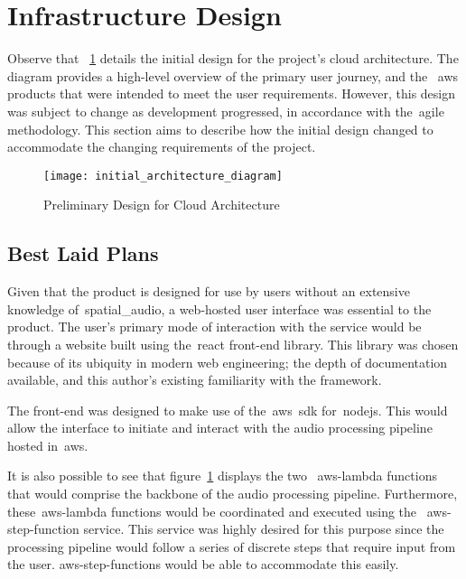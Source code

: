 \thispagestyle{plain}
\newpage
\section{Infrastructure Design}\label{sec:infrastructure-design}

\normalsize

Observe that ~\ref{fig:preliminary-design} details the initial design for the project's cloud architecture.
The diagram provides a high-level overview of the primary user journey,
and the ~\gls{aws} products that were intended to meet the user requirements.
However, this design was subject to change as development progressed, in accordance with the~\gls{agile} methodology.
This section aims to describe how the initial design changed to accommodate the changing requirements of the project.

\begin{figure}[!htb]
    \minipage{\textwidth}
    \texttt{[image: initial\_architecture\_diagram]}
    \caption{Preliminary Design for Cloud Architecture}\label{fig:preliminary-design}
    \endminipage\hfill
\end{figure}

\subsection{Best Laid Plans}\label{subsec:best-laid-plans}

Given that the product is designed for use by users without an extensive knowledge of~\gls{spatial_audio},
a web-hosted user interface was essential to the product.
The user’s primary mode of interaction with the service would be through a website
built using the~\gls{react} front-end library.
This library was chosen because of its ubiquity in modern web engineering; the depth of documentation available,
and this author’s existing familiarity with the framework.

The front-end was designed to make use of the~\gls{aws}~\gls{sdk} for~\gls{nodejs}.
This would allow the interface to initiate and interact with the audio processing pipeline hosted in~\gls{aws}.

It is also possible to see
that figure~\ref{fig:preliminary-design} displays the two ~\gls{aws-lambda} functions
that would comprise the backbone of the audio processing pipeline.
Furthermore,
these~\gls{aws-lambda} functions would be coordinated and executed using the ~\gls{aws-step-function} service.
This service was highly desired for this purpose
since the processing pipeline would follow a series of discrete steps that require input from the user.
\glspl{aws-step-function} would be able to accommodate this easily.

